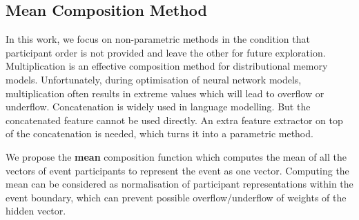 \documentclass[a4paper]{article}
\begin{document}
\subsection{Mean Composition Method} \label{sec:mean-composition}
In this work, we focus on non-parametric methods in the condition that participant order is not provided and leave the other for future exploration. Multiplication is an effective composition method for distributional memory models. Unfortunately, during optimisation of neural network models, multiplication often results in extreme values which will lead to overflow or underflow. Concatenation is widely used in language modelling. But the concatenated feature cannot be used directly. An extra feature extractor on top of the concatenation is needed, which turns it into a parametric method. 
% 
% 
% 
%
% 
%
% 
%


We propose the \textbf{mean} composition function which computes the mean of all the vectors of event participants to represent the event as one vector. Computing the mean can be considered as normalisation of participant representations within the event boundary, which can prevent possible overflow/underflow of weights of the hidden vector. 
\end{document}
